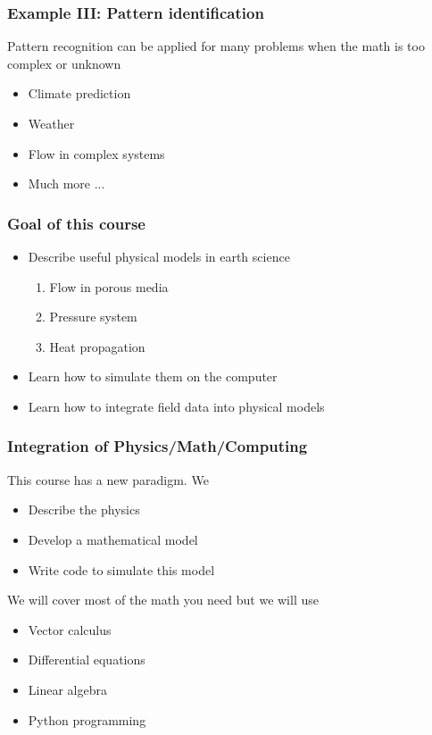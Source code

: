 \documentclass[12pt,fleqn]{beamer}
\begin{document}
\begin{frame}
\frametitle{Example III: Pattern identification}

Pattern recognition can be applied for
many problems when the math is too complex
or unknown
\begin{itemize}
\item Climate prediction
\item Weather
\item Flow in complex systems
\item Much more ...
\end{itemize}




\end{frame}


\begin{frame}
\frametitle{Goal of this course}

\begin{itemize}
\item Describe useful physical models in earth science
\begin{enumerate}
\item Flow in porous media
\item Pressure system
\item Heat propagation
\end{enumerate}
\item Learn how to simulate them on the computer
\item Learn how to integrate field data into physical models
\end{itemize}

\end{frame}

\begin{frame}
\frametitle{Integration of Physics/Math/Computing}

This course has a new paradigm. We 
\begin{itemize}
\item Describe the physics
\item Develop a mathematical model
\item Write code to simulate this model
\end{itemize}

\vspace{12pt}

We will cover most of the math you need but we will use
\begin{itemize}
\item Vector calculus
\item Differential equations
\item Linear algebra
\item Python programming
\end{itemize}


\end{frame}
\end{document}
